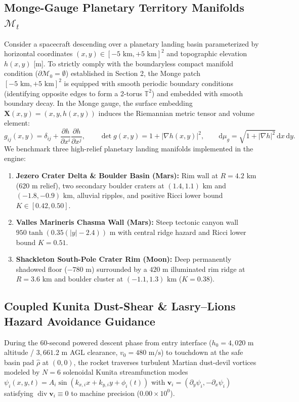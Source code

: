 \documentclass[11pt,a4paper,reqno]{article}
\theoremstyle{definition}
\theoremstyle{remark}
\begin{document}
\subsection[Monge-Gauge Planetary Territory Manifolds Mt]{Monge-Gauge Planetary Territory Manifolds $\mathcal{M}_t$}
Consider a spacecraft descending over a planetary landing basin parameterized by horizontal coordinates $(x, y) \in [-5\text{ km}, +5\text{ km}]^2$ and topographic elevation $h(x,y)$ [m]. To strictly comply with the boundaryless compact manifold condition ($\partial \mathcal{M}_0 = \emptyset$) established in Section 2, the Monge patch $[-5\text{ km}, +5\text{ km}]^2$ is equipped with smooth periodic boundary conditions (identifying opposite edges to form a 2-torus $\mathbb{T}^2$) and embedded with smooth boundary decay. In the Monge gauge, the surface embedding $\mathbf{X}(x,y) = (x, y, h(x,y))$ induces the Riemannian metric tensor and volume element:
\begin{equation}\label{eq:monge_metric}
  g_{ij}(x,y) = \delta_{ij} + \frac{\partial h}{\partial x^i}\frac{\partial h}{\partial x^j}, \qquad
  \det g(x,y) = 1 + |\nabla h(x,y)|^2, \qquad \mathrm{d}\mu_g = \sqrt{1 + |\nabla h|^2}\,\mathrm{d}x\,\mathrm{d}y.
\end{equation}
We benchmark three high-relief planetary landing manifolds implemented in the engine:
\begin{enumerate}
  \item \textbf{Jezero Crater Delta \& Boulder Basin (Mars):} Rim wall at $R = 4.2\text{ km}$ ($620\text{ m}$ relief), two secondary boulder craters at $(1.4, 1.1)\text{ km}$ and $(-1.8, -0.9)\text{ km}$, alluvial ripples, and positive Ricci lower bound $K \in [0.42, 0.50]$.
  \item \textbf{Valles Marineris Chasma Wall (Mars):} Steep tectonic canyon wall $950\tanh(0.35(|y|-2.4))\text{ m}$ with central ridge hazard and Ricci lower bound $K = 0.51$.
  \item \textbf{Shackleton South-Pole Crater Rim (Moon):} Deep permanently shadowed floor ($-780\text{ m}$) surrounded by a $420\text{ m}$ illuminated rim ridge at $R = 3.6\text{ km}$ and boulder cluster at $(-1.1, 1.3)\text{ km}$ ($K = 0.38$).
\end{enumerate}

\subsection{Coupled Kunita Dust-Shear \& Lasry--Lions Hazard Avoidance Guidance}
During the 60-second powered descent phase from entry interface ($h_0 = 4,020\text{ m}$ altitude / $3,661.2\text{ m}$ AGL clearance, $v_0 = 480\text{ m/s}$) to touchdown at the safe basin pad $\hat{\rho}$ at $(0,0)$, the rocket traverses turbulent Martian dust-devil vortices modeled by $N = 6$ solenoidal Kunita streamfunction modes $\psi_i(x,y,t) = A_i \sin(k_{x,i} x + k_{y,i} y + \phi_i(t))$ with $\mathbf{v}_i = (\partial_y\psi_i, -\partial_x\psi_i)$ satisfying $\operatorname{div}\mathbf{v}_i \equiv 0$ to machine precision ($0.00 \times 10^{0}$).
\end{document}

